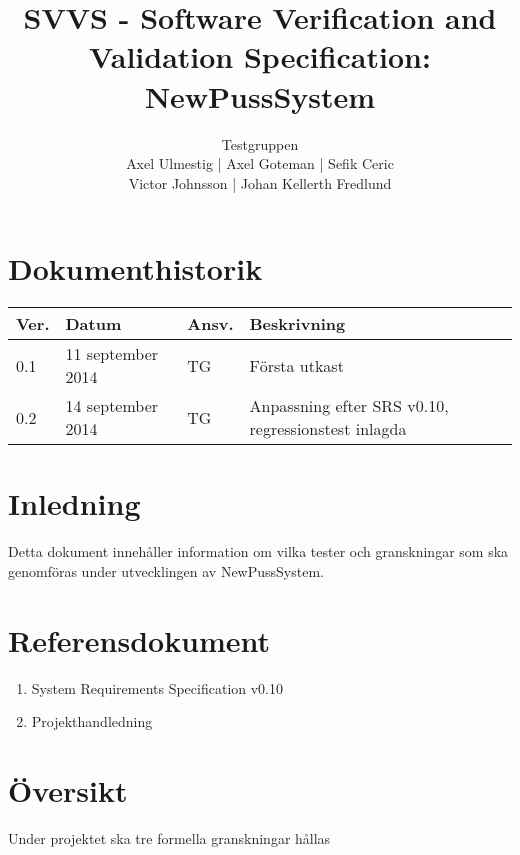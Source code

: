 \documentclass[a4paper]{article}
\title{SVVS - Software Verification and Validation Specification: NewPussSystem}
\author{Testgruppen \\ Axel Ulmestig | Axel Goteman | Sefik Ceric \\ Victor Johnsson | Johan Kellerth Fredlund}
\date{}
\begin{document}
\maketitle
\thispagestyle{fancy}
\tableofcontents
\newpage

\section*{Dokumenthistorik}

\begin{tabular}{ l l l l }
Ver. & Datum & Ansv. & Beskrivning \\\hline
0.1 & 11 september 2014 & TG & Första utkast \\
0.2 & 14 september 2014 & TG & Anpassning efter SRS v0.10, regressionstest inlagda

\end{tabular}
\section{Inledning}       

Detta dokument innehåller information om vilka tester och granskningar som ska genomföras under utvecklingen av NewPussSystem.

\section{Referensdokument}
\begin{enumerate}
\item System Requirements Specification v0.10
\item Projekthandledning
\end{enumerate}

\section{Översikt}

Under projektet ska tre formella granskningar hållas
\end{document}
